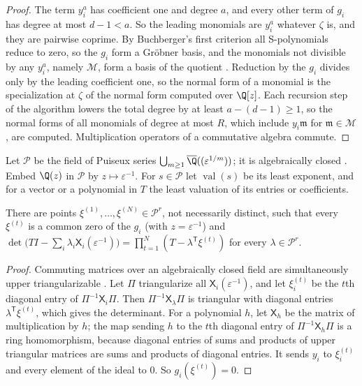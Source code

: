 \begin{proof}
The term $y_i^a$ has coefficient one and degree $a$, and every other term of
$g_i$ has degree at most $d-1<a$. So the leading monomials are $y_i^a$
whatever $\zeta$ is, and they are pairwise coprime. By Buchberger's first
criterion all S-polynomials reduce to zero, so the $g_i$ form a Gr\"obner basis,
and the monomials not divisible by any $y_i^a$, namely $\mathcal M$, form a
basis of the quotient \citep{cox2015-ideals-varieties-and-algorithms}. Reduction by the $g_i$
divides only by the leading coefficient one, so the normal form of a monomial
is the specialization at $\zeta$ of the normal form computed over $\Q[z]$.
Each recursion step of the algorithm lowers the total degree by at least
$a-(d-1)\ge1$, so the normal forms of all monomials of degree at most $R$,
which include $y_i\mathfrak m$ for $\mathfrak m\in\mathcal M$, are computed. Multiplication
operators of a commutative algebra commute.
\end{proof}

Let $\mathcal P$ be the field of Puiseux series
$\bigcup_{m\ge1}\overline\Q((\varepsilon^{1/m}))$; it is algebraically closed
\citep{basu2006-algorithms-in-real-algebraic-geometry}. Embed $\Q(z)$ in $\mathcal P$ by $z\mapsto\varepsilon^{-1}$.
For $s\in\mathcal P$ let $\operatorname{val}(s)$ be its least exponent, and for a
vector or a polynomial in $T$ the least valuation of its entries or
coefficients.

\begin{lemma}\label{lem:int:triangular}
There are points $\xi^{(1)},\ldots,\xi^{(N)}\in\mathcal P^r$, not necessarily
distinct, such that every $\xi^{(t)}$ is a common zero of the $g_i$ (with
$z=\varepsilon^{-1}$) and $\det\bigl(TI-\sum_i\lambda_i\mathsf X_i(\varepsilon^{-1})\bigr)
=\prod_{t=1}^N(T-\lambda^{\mathsf T}\xi^{(t)})$ for every $\lambda\in\mathcal P^r$.
\end{lemma}

\begin{proof}
Commuting matrices over an algebraically closed field are simultaneously
upper triangularizable \citep{horn2013-matrix-analysis}. Let $\Pi$ triangularize all
$\mathsf X_i(\varepsilon^{-1})$, and let $\xi^{(t)}_i$ be the $t$th diagonal entry of
$\Pi^{-1}\mathsf X_i\Pi$. Then $\Pi^{-1}\mathsf X_\lambda\Pi$ is triangular with diagonal
entries $\lambda^{\mathsf T}\xi^{(t)}$, which gives the determinant. For a
polynomial $h$, let $\mathsf X_h$ be the matrix of multiplication by $h$; the map
sending $h$ to the $t$th diagonal entry of $\Pi^{-1}\mathsf X_h\Pi$ is a ring
homomorphism, because diagonal entries of sums and products of upper triangular
matrices are sums and products of diagonal entries. It sends $y_i$ to
$\xi^{(t)}_i$ and every element of the ideal to $0$. So $g_i(\xi^{(t)})=0$.
\end{proof}

